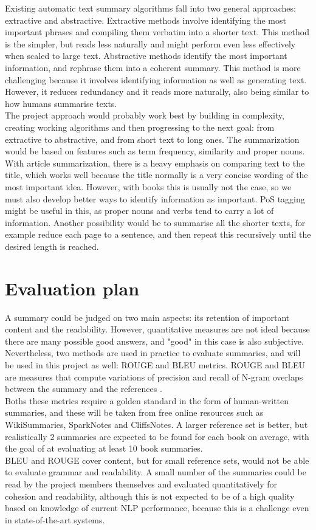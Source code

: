 Existing automatic text summary algorithms fall into two general approaches: extractive and abstractive. Extractive methods involve identifying the most important phrases and compiling them verbatim into a shorter text. This method is the simpler, but reads less naturally and might perform even less effectively when scaled to large text. Abstractive methods identify the most important information, and rephrase them into a coherent summary. This method is more challenging because it involves identifying information as well as generating text. However, it reduces redundancy and it reads more naturally, also being similar to how humans summarise texts. \cite{Gaikwad2016} \\
The project approach would probably work best by building in complexity, creating working algorithms and then progressing to the next goal: from extractive to abstractive, and from short text to long ones. The summarization would be based on features such as term frequency, similarity and proper nouns. With article summarization, there is a heavy emphasis on comparing text to the title, which works well because the title normally is a very concise wording of the most important idea. However, with books this is usually not the case, so we must also develop better ways to identify information as important. PoS tagging might be useful in this, as proper nouns and verbs tend to carry a lot of information. Another possibility would be to summarise all the shorter texts, for example reduce each page to a sentence, and then repeat this recursively until the desired length is reached.

\section{Evaluation plan}
A summary could be judged on two main aspects: its retention of important content and the readability. However, quantitative measures are not ideal because there are many possible good answers, and "good" in this case is also subjective. Nevertheless, two methods are used in practice to evaluate summaries, and will be used in this project as well: ROUGE and BLEU metrics. ROUGE and BLEU are measures that compute variations of precision and recall of N-gram overlaps between the summary and the references \cite{nenkova2006summarization} \cite{lin2004rouge}. \\
Boths these metrics require a golden standard in the form of human-written summaries, and these will be taken from free online resources such as WikiSummaries, SparkNotes and CliffsNotes. A larger reference set is better, but realistically 2 summaries are expected to be found for each book on average, with the goal of at evaluating at least 10 book summaries. \\
BLEU and ROUGE cover content, but for small reference sets, would not be able to evaluate grammar and readability. A small number of the summaries could be read by the project members themselves and evaluated quantitatively for cohesion and readability, although this is not expected to be of a high quality based on knowledge of current NLP performance, because this is a challenge even in state-of-the-art systems.

